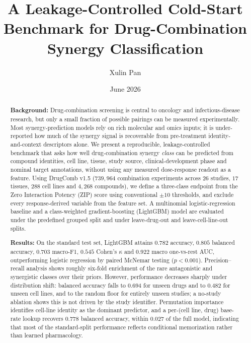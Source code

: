 \documentclass[11pt]{article}
\title{\textbf{A Leakage-Controlled Cold-Start Benchmark for Drug-Combination Synergy
Classification}}
\author[1]{Xulin Pan}
\affil[1]{The Pennsylvania State University, University Park, PA, USA \\ \texttt{xxp5066@psu.edu}}
\date{June 2026}
\begin{document}
\maketitle

\begin{abstract}
\noindent
\textbf{Background:}
Drug-combination screening is central to oncology and infectious-disease research, but only a small
fraction of possible pairings can be measured experimentally. Most synergy-prediction models rely on
rich molecular and omics inputs; it is under-reported how much of the synergy signal is recoverable
from pre-treatment identity-and-context descriptors alone. We present a reproducible,
leakage-controlled benchmark that asks how well drug-combination synergy \emph{class} can be predicted
from compound identities, cell line, tissue, study source, clinical-development phase and nominal
target annotations, without using any measured dose-response readout as a feature. Using DrugComb v1.5
($739{,}964$ combination experiments across $26$ studies, $17$ tissues, $288$ cell lines and
$4{,}268$ compounds), we define a three-class endpoint from the Zero Interaction Potency (ZIP) score
using conventional $\pm 10$ thresholds, and exclude every response-derived variable from the feature
set. A multinomial logistic-regression baseline and a class-weighted gradient-boosting (LightGBM) model
are evaluated under the predefined grouped split and under leave-drug-out and leave-cell-line-out
splits.

\smallskip\noindent
\textbf{Results:}
On the standard test set, LightGBM attains $0.782$ accuracy, $0.805$ balanced accuracy, $0.703$
macro-F1, $0.545$ Cohen's $\kappa$ and $0.922$ macro one-vs-rest AUC, outperforming logistic regression
by paired McNemar testing ($p<0.001$). Precision--recall analysis shows roughly six-fold enrichment of
the rare antagonistic and synergistic classes over their priors. However, performance decreases sharply
under distribution shift: balanced accuracy falls to $0.694$ for unseen drugs and to $0.482$ for unseen
cell lines, and to the random floor for entirely unseen studies; a no-study ablation shows this is not
driven by the study identifier. Permutation importance identifies cell-line identity as the dominant
predictor, and a per-(cell line, drug) base-rate lookup recovers $0.778$ balanced accuracy, within
$0.027$ of the full model, indicating that most of the standard-split performance reflects conditional
memorization rather than learned pharmacology.


\end{abstract}
\end{document}
